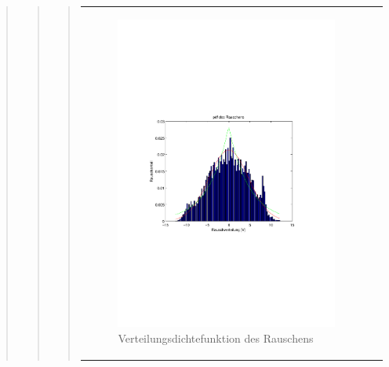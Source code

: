 \begin{quote}
\begin{quote}
\begin{quote}
\begin{center}
\begin{tabular}{ll}
\begin{minipage}{0.6\textwidth}
            \end{minipage}
        
            \begin{minipage}{0.6\textwidth}
                \begin{figure}[H]
                    \includegraphics[scale=0.7, trim = 15mm 80mm 20mm 90mm, clip]{Bilder/hist0}
                    \caption{Verteilungsdichtefunktion des Rauschens}
                    \label{fig:hist0}
                \end{figure}
        
            \end{minipage}
        
        \end{tabular}
        \end{center}
            
            \vspace{2em}
            

\end{quote}
\end{quote}
\end{quote}
